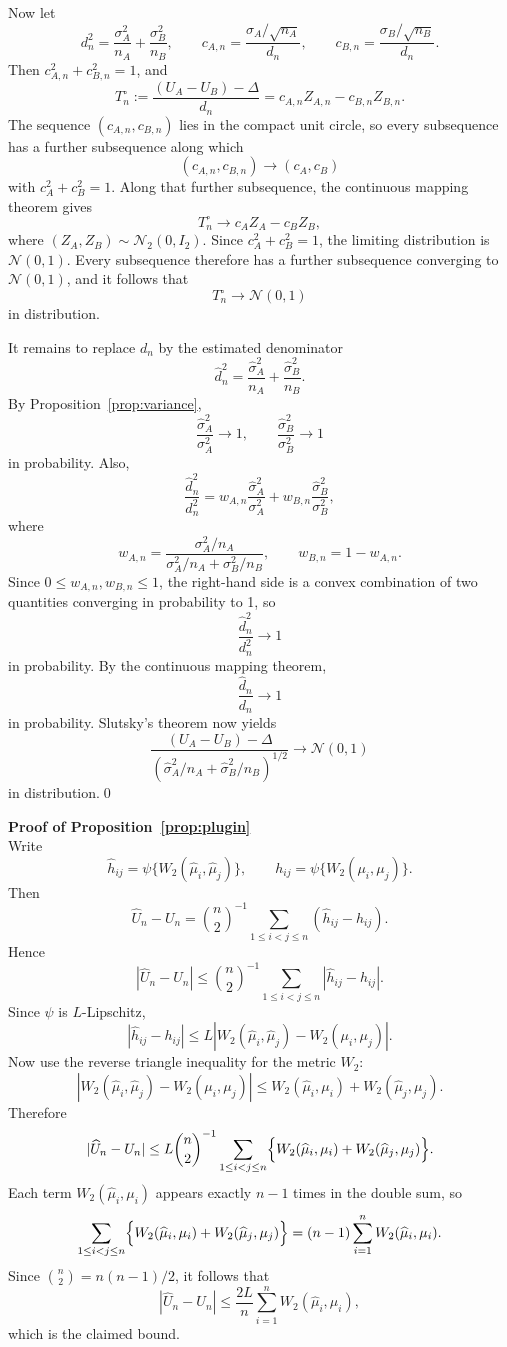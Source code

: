 \documentclass[10pt]{article}
\newcommand{\W}{W_2}
\begin{document}
Now let
\[
d_n^2=\frac{\sigma_A^2}{n_A}+\frac{\sigma_B^2}{n_B},
\qquad
c_{A,n}=\frac{\sigma_A/\sqrt{n_A}}{d_n},
\qquad
c_{B,n}=\frac{\sigma_B/\sqrt{n_B}}{d_n}.
\]
Then $c_{A,n}^2+c_{B,n}^2=1$, and
\[
T_n^{\circ}
:=
\frac{(U_A-U_B)-\Delta}{d_n}
=
c_{A,n}Z_{A,n}-c_{B,n}Z_{B,n}.
\]
The sequence $(c_{A,n},c_{B,n})$ lies in the compact unit circle, so every subsequence has a further subsequence along which
\[
(c_{A,n},c_{B,n})\to (c_A,c_B)
\]
with $c_A^2+c_B^2=1$. Along that further subsequence, the continuous mapping theorem gives
\[
T_n^{\circ}\to c_A Z_A-c_B Z_B,
\]
where $(Z_A,Z_B)\sim \mathcal{N}_2(0,I_2)$. Since $c_A^2+c_B^2=1$, the limiting distribution is $\mathcal{N}(0,1)$. Every subsequence therefore has a further subsequence converging to $\mathcal{N}(0,1)$, and it follows that
\[
T_n^{\circ}\to \mathcal{N}(0,1)
\]
in distribution.

It remains to replace $d_n$ by the estimated denominator
\[
\widehat d_n^2=\frac{\widehat\sigma_A^2}{n_A}+\frac{\widehat\sigma_B^2}{n_B}.
\]
By Proposition~\ref{prop:variance},
\[
\frac{\widehat\sigma_A^2}{\sigma_A^2}\to 1,
\qquad
\frac{\widehat\sigma_B^2}{\sigma_B^2}\to 1
\]
in probability. Also,
\[
\frac{\widehat d_n^2}{d_n^2}
=
w_{A,n}\frac{\widehat\sigma_A^2}{\sigma_A^2}
+
w_{B,n}\frac{\widehat\sigma_B^2}{\sigma_B^2},
\]
where
\[
w_{A,n}
=
\frac{\sigma_A^2/n_A}{\sigma_A^2/n_A+\sigma_B^2/n_B},
\qquad
w_{B,n}=1-w_{A,n}.
\]
Since $0\leq w_{A,n},w_{B,n}\leq 1$, the right-hand side is a convex combination of two quantities converging in probability to 1, so
\[
\frac{\widehat d_n^2}{d_n^2}\to 1
\]
in probability. By the continuous mapping theorem,
\[
\frac{\widehat d_n}{d_n}\to 1
\]
in probability. Slutsky's theorem now yields
\[
\frac{(U_A-U_B)-\Delta}
{(\widehat\sigma_A^2/n_A+\widehat\sigma_B^2/n_B)^{1/2}}
\to \mathcal{N}(0,1)
\]
in distribution.\qed


\vspace{1cm}
\noindent \textbf{Proof of Proposition~\ref{prop:plugin}}\\
Write
\[
\widehat h_{ij}
=
\psi\bigl\{\W(\widehat\mu_i,\widehat\mu_j)\bigr\},
\qquad
h_{ij}
=
\psi\bigl\{\W(\mu_i,\mu_j)\bigr\}.
\]
Then
\[
\widehat U_n-U_n
=
\binom{n}{2}^{-1}\sum_{1\leq i<j\leq n}(\widehat h_{ij}-h_{ij}).
\]
Hence
\[
|\widehat U_n-U_n|
\leq
\binom{n}{2}^{-1}\sum_{1\leq i<j\leq n}|\widehat h_{ij}-h_{ij}|.
\]
Since $\psi$ is $L$-Lipschitz,
\[
|\widehat h_{ij}-h_{ij}|
\leq
L\left|
\W(\widehat\mu_i,\widehat\mu_j)-\W(\mu_i,\mu_j)
\right|.
\]
Now use the reverse triangle inequality for the metric $\W$:
\[
\left|
\W(\widehat\mu_i,\widehat\mu_j)-\W(\mu_i,\mu_j)
\right|
\leq
\W(\widehat\mu_i,\mu_i)+\W(\widehat\mu_j,\mu_j).
\]
Therefore
\[
|\widehat U_n-U_n|
\leq
L\binom{n}{2}^{-1}\sum_{1\leq i<j\leq n}
\Bigl\{\W(\widehat\mu_i,\mu_i)+\W(\widehat\mu_j,\mu_j)\Bigr\}.
\]
Each term $\W(\widehat\mu_i,\mu_i)$ appears exactly $n-1$ times in the double sum, so
\[
\sum_{1\leq i<j\leq n}
\Bigl\{\W(\widehat\mu_i,\mu_i)+\W(\widehat\mu_j,\mu_j)\Bigr\}
=
(n-1)\sum_{i=1}^n \W(\widehat\mu_i,\mu_i).
\]
Since $\binom{n}{2}=n(n-1)/2$, it follows that
\[
|\widehat U_n-U_n|
\leq
\frac{2L}{n}\sum_{i=1}^n \W(\widehat\mu_i,\mu_i),
\]
which is the claimed bound.
\end{document}
